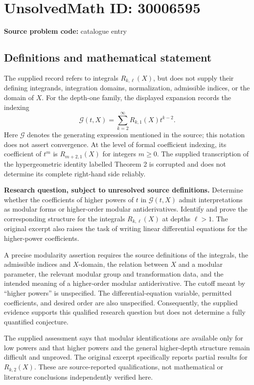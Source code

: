 \documentclass[11pt]{article}
\begin{document}
\section*{UnsolvedMath ID: 30006595}
\textbf{Source problem code:} catalogue entry
\subsection{Definitions and mathematical statement}
The supplied record refers to integrals \(R_{k,\ell}(X)\), but does not supply their defining integrands, integration domains, normalization, admissible indices, or the domain of \(X\). For the depth-one family, the displayed expansion records the indexing
\[
\mathcal G(t,X)=\sum_{k=2}^{\infty}R_{k,1}(X)t^{k-2}.
\]
Here \(\mathcal G\) denotes the generating expression mentioned in the source; this notation does not assert convergence. At the level of formal coefficient indexing, its coefficient of \(t^m\) is \(R_{m+2,1}(X)\) for integers \(m\geq 0\). The supplied transcription of the hypergeometric identity labelled Theorem 2 is corrupted and does not determine its complete right-hand side reliably.

\textbf{Research question, subject to unresolved source definitions.} Determine whether the coefficients of higher powers of \(t\) in \(\mathcal G(t,X)\) admit interpretations as modular forms or higher-order modular antiderivatives. Identify and prove the corresponding structure for the integrals \(R_{k,\ell}(X)\) at depths \(\ell>1\). The original excerpt also raises the task of writing linear differential equations for the higher-power coefficients.

A precise modularity assertion requires the source definitions of the integrals, the admissible indices and \(X\)-domain, the relation between \(X\) and a modular parameter, the relevant modular group and transformation data, and the intended meaning of a higher-order modular antiderivative. The cutoff meant by ``higher powers'' is unspecified. The differential-equation variable, permitted coefficients, and desired order are also unspecified. Consequently, the supplied evidence supports this qualified research question but does not determine a fully quantified conjecture.

The supplied assessment says that modular identifications are available only for low powers and that higher powers and the general higher-depth structure remain difficult and unproved. The original excerpt specifically reports partial results for \(R_{k,2}(X)\). These are source-reported qualifications, not mathematical or literature conclusions independently verified here.
\end{document}
